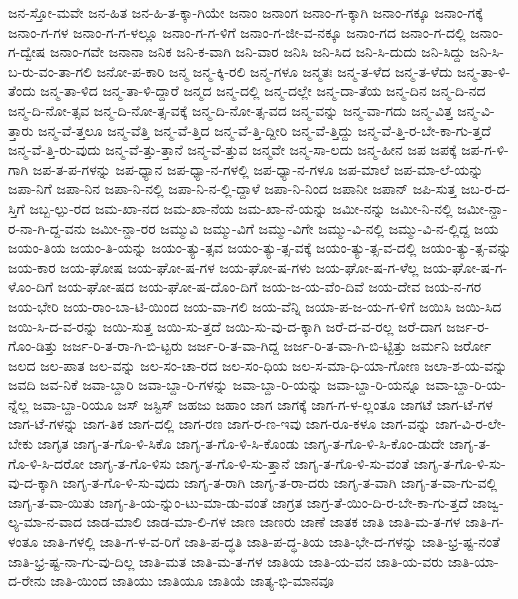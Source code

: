 {ಜನ-ಸ್ತೋ-ಮವೇ
ಜನ-ಹಿತ
ಜನ-ಹಿ-ತ-ಕ್ಕಾ-ಗಿಯೇ
ಜನಾಂ
ಜನಾಂಗ
ಜನಾಂ-ಗ-ಕ್ಕಾಗಿ
ಜನಾಂ-ಗಕ್ಕೂ
ಜನಾಂ-ಗಕ್ಕೆ
ಜನಾಂ-ಗ-ಗಳ
ಜನಾಂ-ಗ-ಗ-ಳಲ್ಲೂ
ಜನಾಂ-ಗ-ಗ-ಳಿಗೆ
ಜನಾಂ-ಗ-ಜೀ-ವ-ನಕ್ಕೂ
ಜನಾಂ-ಗದ
ಜನಾಂ-ಗ-ದಲ್ಲಿ
ಜನಾಂ-ಗ-ದ್ವೇಷ
ಜನಾಂ-ಗವೇ
ಜನಾನಾ
ಜನಿಕ
ಜನಿ-ಕ-ವಾಗಿ
ಜನಿ-ವಾರ
ಜನಿಸಿ
ಜನಿ-ಸಿದ
ಜನಿ-ಸಿ-ದುದು
ಜನಿ-ಸಿದ್ದು
ಜನಿ-ಸಿ-ಬ-ರು-ವಂ-ತಾ-ಗಲಿ
ಜನೋ-ಪ-ಕಾರಿ
ಜನ್ಮ
ಜನ್ಮ-ಕ್ಕಿ-ರಲಿ
ಜನ್ಮ-ಗಳೂ
ಜನ್ಮತಃ
ಜನ್ಮ-ತ-ಳೆದ
ಜನ್ಮ-ತ-ಳೆದು
ಜನ್ಮ-ತಾ-ಳಿ-ತೆಂದು
ಜನ್ಮ-ತಾ-ಳಿದ
ಜನ್ಮ-ತಾ-ಳಿ-ದ್ದಾರೆ
ಜನ್ಮದ
ಜನ್ಮ-ದಲ್ಲಿ
ಜನ್ಮ-ದಲ್ಲೇ
ಜನ್ಮ-ದಾ-ತೆಯ
ಜನ್ಮ-ದಿನ
ಜನ್ಮ-ದಿ-ನದ
ಜನ್ಮ-ದಿ-ನೋ-ತ್ಸವ
ಜನ್ಮ-ದಿ-ನೋ-ತ್ಸ-ವಕ್ಕೆ
ಜನ್ಮ-ದಿ-ನೋ-ತ್ಸ-ವದ
ಜನ್ಮ-ವನ್ನು
ಜನ್ಮ-ವಾ-ಗದು
ಜನ್ಮ-ವಿತ್ತ
ಜನ್ಮ-ವಿ-ತ್ತಾರು
ಜನ್ಮ-ವೆ-ತ್ತಲೂ
ಜನ್ಮ-ವೆತ್ತಿ
ಜನ್ಮ-ವೆ-ತ್ತಿದ
ಜನ್ಮ-ವೆ-ತ್ತಿ-ದ್ದೀರಿ
ಜನ್ಮ-ವೆ-ತ್ತಿದ್ದು
ಜನ್ಮ-ವೆ-ತ್ತಿ-ರ-ಬೇ-ಕಾ-ಗು-ತ್ತದೆ
ಜನ್ಮ-ವೆ-ತ್ತಿ-ರು-ವುದು
ಜನ್ಮ-ವೆ-ತ್ತು-ತ್ತಾನೆ
ಜನ್ಮ-ವೆ-ತ್ತುವ
ಜನ್ಮವೇ
ಜನ್ಮ-ಸಾ-ಲದು
ಜನ್ಮ-ಹೀನ
ಜಪ
ಜಪಕ್ಕೆ
ಜಪ-ಗ-ಳಿ-ಗಾಗಿ
ಜಪ-ತ-ಪ-ಗಳನ್ನು
ಜಪ-ಧ್ಯಾನ
ಜಪ-ಧ್ಯಾ-ನ-ಗಳಲ್ಲಿ
ಜಪ-ಧ್ಯಾ-ನ-ಗಳೂ
ಜಪ-ಮಾಲೆ
ಜಪ-ಮಾ-ಲೆ-ಯನ್ನು
ಜಪಾ-ನಿಗೆ
ಜಪಾ-ನಿನ
ಜಪಾ-ನಿ-ನಲ್ಲಿ
ಜಪಾ-ನಿ-ನ-ಲ್ಲಿ-ದ್ದಾಳೆ
ಜಪಾ-ನಿ-ನಿಂದ
ಜಪಾನೀ
ಜಪಾನ್
ಜಪಿ-ಸುತ್ತ
ಜಬ-ರ-ದ-ಸ್ತಿಗೆ
ಜಬ್ಬ-ಲ್ಪು-ರದ
ಜಮ-ಖಾ-ನದ
ಜಮ-ಖಾ-ನೆಯ
ಜಮ-ಖಾ-ನೆ-ಯನ್ನು
ಜಮೀ-ನನ್ನು
ಜಮೀ-ನಿ-ನಲ್ಲಿ
ಜಮೀ-ನ್ದಾ-ರ-ನಾ-ಗಿ-ದ್ದ-ವನು
ಜಮೀ-ನ್ದಾ-ರರ
ಜಮ್ಮುವಿ
ಜಮ್ಮು-ವಿಗೆ
ಜಮ್ಮು-ವಿಗೇ
ಜಮ್ಮು-ವಿ-ನಲ್ಲಿ
ಜಮ್ಮು-ವಿ-ನ-ಲ್ಲಿದ್ದ
ಜಯ
ಜಯಂ-ತಿಯ
ಜಯಂ-ತಿ-ಯನ್ನು
ಜಯಂ-ತ್ಯು-ತ್ಸವ
ಜಯಂ-ತ್ಯು-ತ್ಸ-ವಕ್ಕೆ
ಜಯಂ-ತ್ಯು-ತ್ಸ-ವ-ದಲ್ಲಿ
ಜಯಂ-ತ್ಯು-ತ್ಸ-ವನ್ನು
ಜಯ-ಕಾರ
ಜಯ-ಘೋಷ
ಜಯ-ಘೋ-ಷ-ಗಳ
ಜಯ-ಘೋ-ಷ-ಗಳು
ಜಯ-ಘೋ-ಷ-ಗ-ಳೆಲ್ಲ
ಜಯ-ಘೋ-ಷ-ಗ-ಳೊಂ-ದಿಗೆ
ಜಯ-ಘೋ-ಷದ
ಜಯ-ಘೋ-ಷ-ದೊಂ-ದಿಗೆ
ಜಯ-ಜ-ಯ-ವೆಂ-ದಿವೆ
ಜಯ-ದೇವ
ಜಯ-ನ-ಗರ
ಜಯ-ಭೇರಿ
ಜಯ-ರಾಂ-ಬಾ-ಟಿ-ಯಿಂದ
ಜಯ-ವಾ-ಗಲಿ
ಜಯ-ವೆನ್ನಿ
ಜಯಾ-ಪ-ಜ-ಯ-ಗ-ಳಿಗೆ
ಜಯಿಸಿ
ಜಯಿ-ಸಿದ
ಜಯಿ-ಸಿ-ದ-ವ-ರನ್ನು
ಜಯಿ-ಸುತ್ತ
ಜಯಿ-ಸು-ತ್ತದೆ
ಜಯಿ-ಸು-ವು-ದ-ಕ್ಕಾಗಿ
ಜರೆ-ದ-ವ-ರಲ್ಲ
ಜರೆ-ದಾಗ
ಜರ್ಜ-ರ-ಗೊಂ-ಡಿತ್ತು
ಜರ್ಜ-ರಿ-ತ-ರಾ-ಗಿ-ಬಿ-ಟ್ಟರು
ಜರ್ಜ-ರಿ-ತ-ವಾ-ಗಿದ್ದ
ಜರ್ಜ-ರಿ-ತ-ವಾ-ಗಿ-ಬಿ-ಟ್ಟಿತ್ತು
ಜರ್ಮನಿ
ಜರ್ರೋ
ಜಲದ
ಜಲ-ಪಾತ
ಜಲ-ವನ್ನು
ಜಲ-ಸಂ-ಚಾ-ರದ
ಜಲ-ಸಂ-ಧಿಯ
ಜಲ-ಸ-ಮಾ-ಧಿ-ಯಾ-ಗೋಣ
ಜಲಾ-ಶ-ಯ-ವನ್ನು
ಜವದಿ
ಜವ-ನಿಕೆ
ಜವಾ-ಬ್ದಾರಿ
ಜವಾ-ಬ್ದಾ-ರಿ-ಗಳನ್ನು
ಜವಾ-ಬ್ದಾ-ರಿ-ಯನ್ನು
ಜವಾ-ಬ್ದಾ-ರಿ-ಯನ್ನೂ
ಜವಾ-ಬ್ದಾ-ರಿ-ಯ-ನ್ನೆಲ್ಲ
ಜವಾ-ಬ್ದಾ-ರಿಯೂ
ಜಸ್
ಜಸ್ಟಿಸ್
ಜಹಜು
ಜಹಾಂ
ಜಾಗ
ಜಾಗಕ್ಕೆ
ಜಾಗ-ಗ-ಳ-ಲ್ಲಂತೂ
ಜಾಗಟೆ
ಜಾಗ-ಟೆ-ಗಳ
ಜಾಗ-ಟೆ-ಗಳನ್ನು
ಜಾಗ-ತಿಕ
ಜಾಗ-ದಲ್ಲಿ
ಜಾಗ-ರಣ
ಜಾಗ-ರ-ಣ-ಇವು
ಜಾಗ-ರೂ-ಕಳೂ
ಜಾಗ-ವನ್ನು
ಜಾಗ-ವಿ-ರ-ಲೇ-ಬೇಕು
ಜಾಗೃತ
ಜಾಗೃ-ತ-ಗೊ-ಳಿ-ಸಿಕೊ
ಜಾಗೃ-ತ-ಗೊ-ಳಿ-ಸಿ-ಕೊಂಡು
ಜಾಗೃ-ತ-ಗೊ-ಳಿ-ಸಿ-ಕೊಂ-ಡುದೇ
ಜಾಗೃ-ತ-ಗೊ-ಳಿ-ಸಿ-ದರೋ
ಜಾಗೃ-ತ-ಗೊ-ಳಿಸು
ಜಾಗೃ-ತ-ಗೊ-ಳಿ-ಸು-ತ್ತಾನೆ
ಜಾಗೃ-ತ-ಗೊ-ಳಿ-ಸು-ವಂತೆ
ಜಾಗೃ-ತ-ಗೊ-ಳಿ-ಸು-ವು-ದ-ಕ್ಕಾಗಿ
ಜಾಗೃ-ತ-ಗೊ-ಳಿ-ಸು-ವುದು
ಜಾಗೃ-ತ-ರಾಗಿ
ಜಾಗೃ-ತ-ರಾ-ದರು
ಜಾಗೃ-ತ-ವಾಗಿ
ಜಾಗೃ-ತ-ವಾ-ಗು-ವಲ್ಲಿ
ಜಾಗೃ-ತ-ವಾ-ಯಿತು
ಜಾಗೃ-ತಿ-ಯ-ನ್ನುಂ-ಟು-ಮಾ-ಡು-ವಂತೆ
ಜಾಗ್ರತ
ಜಾಗ್ರ-ತೆ-ಯಿಂ-ದಿ-ರ-ಬೇ-ಕಾ-ಗು-ತ್ತದೆ
ಜಾಜ್ವ-ಲ್ಯ-ಮಾ-ನ-ವಾದ
ಜಾಡ-ಮಾಲಿ
ಜಾಡ-ಮಾ-ಲಿ-ಗಳ
ಜಾಣ
ಜಾಣರು
ಜಾಣೆ
ಜಾತಕ
ಜಾತಿ
ಜಾತಿ-ಮ-ತ-ಗಳ
ಜಾತಿ-ಗ-ಳಂತೂ
ಜಾತಿ-ಗಳಲ್ಲಿ
ಜಾತಿ-ಗ-ಳ-ವ-ರಿಗೆ
ಜಾತಿ-ಪ-ದ್ಧತಿ
ಜಾತಿ-ಪ-ದ್ಧ-ತಿಯ
ಜಾತಿ-ಭೇ-ದ-ಗಳನ್ನು
ಜಾತಿ-ಭ್ರ-ಷ್ಟ-ನಂತೆ
ಜಾತಿ-ಭ್ರ-ಷ್ಟ-ನಾ-ಗು-ವು-ದಿಲ್ಲ
ಜಾತಿ-ಮತ
ಜಾತಿ-ಮ-ತ-ಗಳ
ಜಾತಿಯ
ಜಾತಿ-ಯ-ವನ
ಜಾತಿ-ಯ-ವರು
ಜಾತಿ-ಯಾ-ದ-ರೇನು
ಜಾತಿ-ಯಿಂದ
ಜಾತಿಯು
ಜಾತಿಯೂ
ಜಾತಿಯೆ
ಜಾತ್ಯ-ಭಿ-ಮಾನವೂ
}
